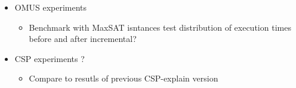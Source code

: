 

\begin{itemize}
    \item OMUS experiments
    \begin{itemize}
        \item Benchmark with MaxSAT isntances test distribution of execution times before and after incremental? 
    \end{itemize}
    \item CSP experiments ? 
    \begin{itemize}
        \item Compare to resutls of previous CSP-explain version
    \end{itemize}
\end{itemize}